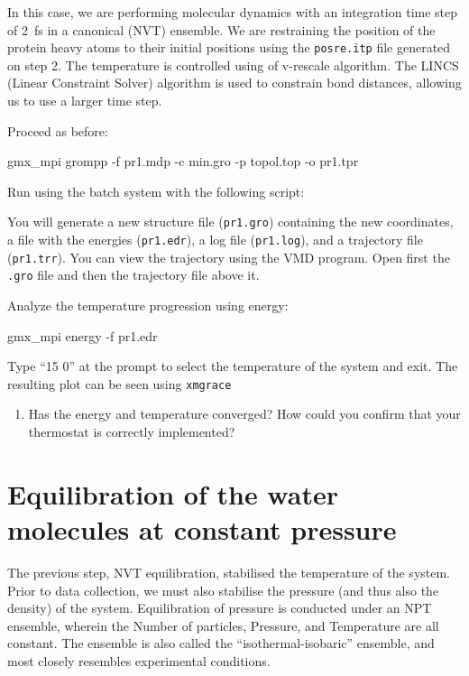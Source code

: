 \documentclass[10pt]{article}
\begin{document}
In this case, we are performing molecular dynamics with an integration time step of 2~fs in a canonical (NVT) ensemble. We are restraining the position of the protein heavy atoms to their initial positions using the \texttt{posre.itp} file generated on step 2. The temperature is controlled using of v-rescale algorithm. The LINCS (Linear Constraint Solver) algorithm is used to constrain bond distances, allowing us to use a larger time step. 

Proceed as before:

\begin{cmdline}
gmx_mpi grompp -f pr1.mdp -c min.gro -p topol.top -o pr1.tpr
\end{cmdline}

Run using the batch system with the following script:

You will generate a new structure file (\texttt{pr1.gro}) containing the new coordinates, a file with the energies (\texttt{pr1.edr}), a log file (\texttt{pr1.log}), and a trajectory file (\texttt{pr1.trr}). You can view the trajectory using the VMD program. Open first the \texttt{.gro} file and then the trajectory file above it. 

Analyze the temperature progression using energy:
\begin{cmdline}
gmx_mpi energy -f pr1.edr 
\end{cmdline}

Type ``15 0'' at the prompt to select the temperature of the system and exit. The resulting plot can be seen using \texttt{xmgrace}

\begin{question}
    \begin{enumerate}[leftmargin=0.6cm]
        \renewcommand{\labelenumi}{Q\arabic{enumi}.}
        \setcounter{enumi}{7}
        \item Has the energy and temperature converged? How could you confirm that your thermostat is correctly implemented?
    \end{enumerate}
\end{question}


\section{Equilibration of the water molecules at constant pressure}

The previous step, NVT equilibration, stabilised the temperature of the system. Prior to data collection, we must also stabilise the pressure (and thus also the density) of the system. Equilibration of pressure is conducted under an NPT ensemble, wherein the Number of particles, Pressure, and Temperature are all constant. The ensemble is also called the ``isothermal-isobaric'' ensemble, and most closely resembles experimental conditions.
\end{document}

